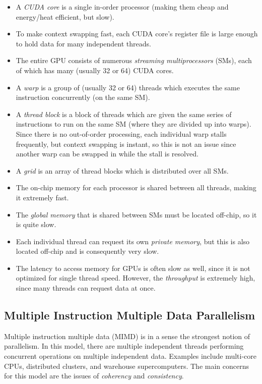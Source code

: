 \documentclass[12pt]{article}
\begin{document}
\begin{itemize}
\item A {\it CUDA core} is a single in-order processor (making them cheap and
energy/heat efficient, but slow).
\item To make context swapping fast, each CUDA core's register file is
large enough to hold data for many independent threads.
\item The entire GPU consists of numerous {\it streaming multiprocessors} (SMs),
each of which has many (usually 32 or 64) CUDA cores.
\item A {\it warp} is a group of (usually 32 or 64) threads which executes
the same instruction concurrently (on the same SM).
\item A {\it thread block} is a block of threads which are given the same
series of instructions to run on the same SM (where they are divided up into
warps).
Since there is no out-of-order processing, each individual warp stalls
frequently, but context swapping is instant, so this is not an issue since
another warp can be swapped in while the stall is resolved.
\item A {\it grid} is an array of thread blocks which is distributed over
all SMs.
\item The on-chip memory for each processor is shared between all threads,
making it extremely fast.
\item The {\it global memory} that is shared between SMs must be located 
off-chip, so it is quite slow.
\item Each individual thread can request its own {\it private memory},
but this is also located off-chip and is consequently very slow.
\item The latency to access memory for GPUs is often slow as well, since
it is not optimized for single thread speed.
However, the {\it throughput} is extremely high, since many threads can
request data at once.
\end{itemize}

\subsection*{Multiple Instruction Multiple Data Parallelism}

Multiple instruction multiple data (MIMD) is in a sense the strongest notion
of parallelism.
In this model, there are multiple independent threads performing concurrent
operations on multiple independent data.
Examples include multi-core CPUs, distributed clusters, and warehouse 
supercomputers.
The main concerns for this model are the issues of {\it coherency} and
{\it consistency}.
\end{document}
